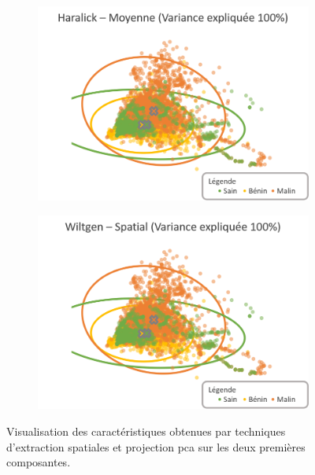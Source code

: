 \begin{figure}[H]
    \begin{subfigure}{.45\textwidth}
      \includegraphics[width=\textwidth]{contents/chapter_4/resources/visualisation_spatial_HaralickMean.png}
    \end{subfigure}
    \begin{subfigure}{.45\textwidth}
      \includegraphics[width=\textwidth]{contents/chapter_4/resources/visualisation_spatial_WiltgenSpatial.png}
    \end{subfigure}
    
    \caption{Visualisation des caractéristiques obtenues par techniques d'extraction spatiales et projection \gls{pca} sur les deux premières composantes.}
    \label{fig:visualisation_spatial}
\end{figure}\par

